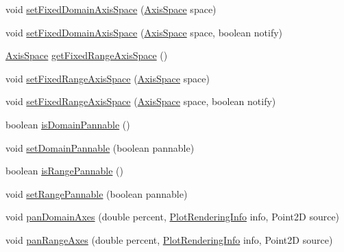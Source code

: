 \begin{DoxyCompactItemize}
void \mbox{\hyperlink{classorg_1_1jfree_1_1chart_1_1plot_1_1_x_y_plot_ae1a120279c51a385f7b7bcf2b564f32f}{set\+Fixed\+Domain\+Axis\+Space}} (\mbox{\hyperlink{classorg_1_1jfree_1_1chart_1_1axis_1_1_axis_space}{Axis\+Space}} space)
\item 
void \mbox{\hyperlink{classorg_1_1jfree_1_1chart_1_1plot_1_1_x_y_plot_a0cfbdc84e78b134669d88f69153f8874}{set\+Fixed\+Domain\+Axis\+Space}} (\mbox{\hyperlink{classorg_1_1jfree_1_1chart_1_1axis_1_1_axis_space}{Axis\+Space}} space, boolean notify)
\item 
\mbox{\hyperlink{classorg_1_1jfree_1_1chart_1_1axis_1_1_axis_space}{Axis\+Space}} \mbox{\hyperlink{classorg_1_1jfree_1_1chart_1_1plot_1_1_x_y_plot_a26ddb69807bccbfb340cab756a2e0521}{get\+Fixed\+Range\+Axis\+Space}} ()
\item 
void \mbox{\hyperlink{classorg_1_1jfree_1_1chart_1_1plot_1_1_x_y_plot_a911cdf973fd36671c538cf41d42a0741}{set\+Fixed\+Range\+Axis\+Space}} (\mbox{\hyperlink{classorg_1_1jfree_1_1chart_1_1axis_1_1_axis_space}{Axis\+Space}} space)
\item 
void \mbox{\hyperlink{classorg_1_1jfree_1_1chart_1_1plot_1_1_x_y_plot_ae759c9c95993b360a0097d826fb2bd62}{set\+Fixed\+Range\+Axis\+Space}} (\mbox{\hyperlink{classorg_1_1jfree_1_1chart_1_1axis_1_1_axis_space}{Axis\+Space}} space, boolean notify)
\item 
boolean \mbox{\hyperlink{classorg_1_1jfree_1_1chart_1_1plot_1_1_x_y_plot_a47e998c45ef12fd238c3477c38655c2b}{is\+Domain\+Pannable}} ()
\item 
void \mbox{\hyperlink{classorg_1_1jfree_1_1chart_1_1plot_1_1_x_y_plot_ac17e70d886ecf38c157b70c1d9f81d8c}{set\+Domain\+Pannable}} (boolean pannable)
\item 
boolean \mbox{\hyperlink{classorg_1_1jfree_1_1chart_1_1plot_1_1_x_y_plot_a8f1c9a3d422e99f3dd189ba632ba3843}{is\+Range\+Pannable}} ()
\item 
void \mbox{\hyperlink{classorg_1_1jfree_1_1chart_1_1plot_1_1_x_y_plot_ae272233e713a6433a33b8cdd8db64c24}{set\+Range\+Pannable}} (boolean pannable)
\item 
void \mbox{\hyperlink{classorg_1_1jfree_1_1chart_1_1plot_1_1_x_y_plot_afdda504a90bd8bd826a707f54fc7cb2e}{pan\+Domain\+Axes}} (double percent, \mbox{\hyperlink{classorg_1_1jfree_1_1chart_1_1plot_1_1_plot_rendering_info}{Plot\+Rendering\+Info}} info, Point2D source)
\item 
void \mbox{\hyperlink{classorg_1_1jfree_1_1chart_1_1plot_1_1_x_y_plot_ae7089e5245a5934e31877dc866f80d5f}{pan\+Range\+Axes}} (double percent, \mbox{\hyperlink{classorg_1_1jfree_1_1chart_1_1plot_1_1_plot_rendering_info}{Plot\+Rendering\+Info}} info, Point2D source)

\end{DoxyCompactItemize}
